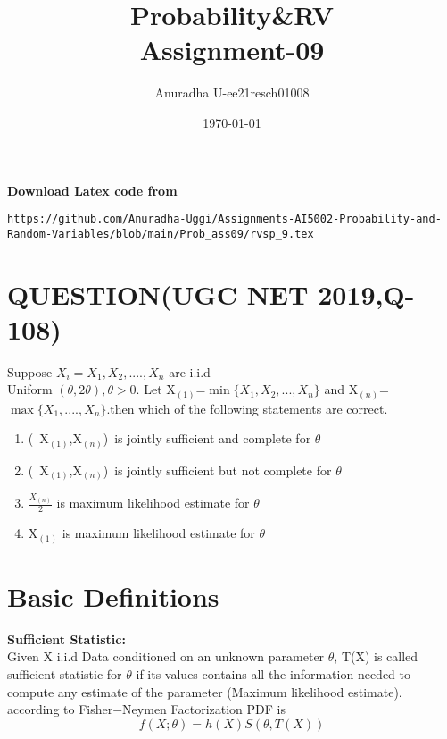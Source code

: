\documentclass[journal,12pt,twocolumn]{IEEEtran}
\title{Probability\&RV \\ Assignment-09}
\author{Anuradha U-ee21resch01008}
\date{\today}
\begin{document}
\maketitle
\newpage
\bigskip
\renewcommand{\thefigure}{\theenumi}
\renewcommand{\thetable}{\theenumi}


\textbf{Download Latex code from}
\begin{lstlisting}
https://github.com/Anuradha-Uggi/Assignments-AI5002-Probability-and-Random-Variables/blob/main/Prob_ass09/rvsp_9.tex
\end{lstlisting}

\section{\textbf{QUESTION(UGC NET 2019,Q-108)}}

Suppose $X_i=X_1,X_2,....,X_n$ are i.i.d \\ Uniform $(\theta,2\theta),\theta> 0$. Let X$_{(1)}$=$\min\{X_1,X_2,...,X_n\}$ and 
X$_{(n)}$=$\max\{X_1,....,X_n\}$.then which of the following statements are correct.\\

\begin{enumerate}
    \item (\ X$_{(1)}$,X$_{(n)}$)\ is jointly sufficient and complete for $\theta$
    \item (\ X$_{(1)}$,X$_{(n)}$)\ is jointly sufficient but not complete for
    $\theta$
    \item $\frac{X_{(n)}}{2}$ is maximum likelihood estimate for $\theta$
    \item X$_{(1)}$ is maximum likelihood estimate for $\theta$
    
\end{enumerate}
\section{\textbf{Basic Definitions}}
\textbf{Sufficient Statistic:}\\

Given X i.i.d Data conditioned on an unknown parameter $\theta$, T(X) is called sufficient statistic for $\theta$ if its values contains all the information needed to compute any estimate of the parameter (Maximum likelihood estimate). according to Fisher$-$Neymen Factorization PDF is \\

\begin{equation}
        f(X;\theta)=h(X)S(\theta,T(X))
\end{equation}
\end{document}
